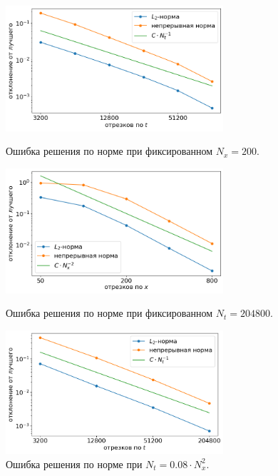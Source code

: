 \begin{figure}[!tp]
	\centering
	\includegraphics[width=0.72\textwidth]{figures/convergence_fixed_nx.png}
	\vspace{-0.2cm}
	\caption{Ошибка решения по норме при фиксированном $N_x = 200$.}
	\label{fig:convergence_fixed_nx}
	\vspace{0.6cm}
	
	\includegraphics[width=0.72\textwidth]{figures/convergence_fixed_nt.png}
	\vspace{-0.2cm}
	\caption{Ошибка решения по норме при фиксированном $N_t = 204800$.}
	\label{fig:convergence_fixed_nt}
	\vspace{0.6cm}
	
	\includegraphics[width=0.72\textwidth]{figures/convergence_connected.png}
	\vspace{-0.2cm}
	\caption{Ошибка решения по норме при $N_t = 0.08 \cdot N_x^2$.}
	\label{fig:convergence_connected}
\end{figure}

